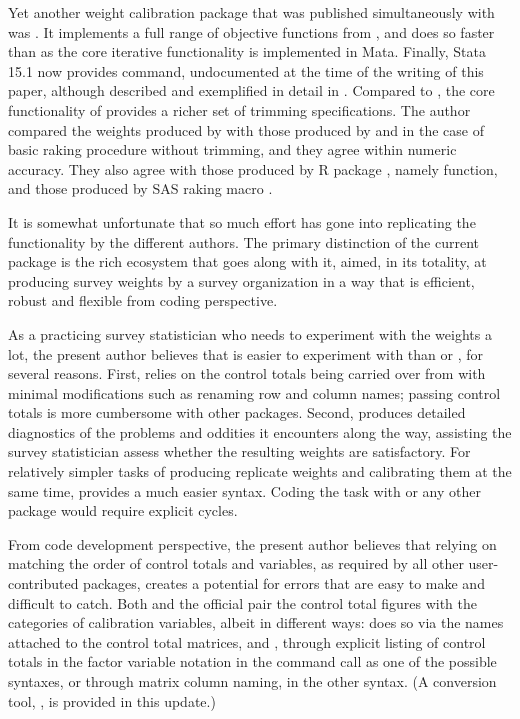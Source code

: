 Yet another weight calibration
package that was published simultaneously with \citet{kolenikov:2014}
was  \citep{pacifico:2014}. It implements a full range
of objective functions from \citet{deville:sarndal:1992}, and does so faster
than  as the core iterative functionality is implemented in Mata.
Finally, Stata 15.1 now provides  command,
undocumented at the time of the writing of this paper, although described 
and exemplified in detail in \citet{dever:valliant:2017}. Compared
to , the core functionality of  provides
a richer set of trimming specifications. The author compared the weights
produced by  with those produced by 
and 
in the case of basic raking procedure without trimming, and they agree within
numeric accuracy. They also agree with those produced by R package
, namely  function, 
and those produced by SAS raking macro  
\citep{izrael:batt:batt:ball:2017}.

It is somewhat unfortunate that so much effort has gone into replicating
the functionality by the different authors. The primary distinction of the current
 package is the rich ecosystem that goes along with it, aimed, 
in its totality, at producing survey weights by a survey organization in 
a way that is efficient, robust and flexible from coding perspective. 

As a practicing survey statistician who needs to experiment
with the weights a lot, the present author believes that 
is easier to experiment with than  or , for several reasons.
First,  relies on the control totals being carried over from  
with minimal modifications such as renaming row and column names; 
passing control totals is more cumbersome with other packages.
Second,  produces detailed diagnostics of the problems and oddities
it encounters along the way, assisting the survey statistician assess whether 
the resulting weights are satisfactory. For relatively simpler tasks of producing
replicate weights and calibrating them at the same time,  provides
a much easier syntax. Coding the task with  or any other package would 
require explicit cycles.

From code development perspective, the present author believes that relying 
on matching the order of control
totals and variables, as required by all other user-contributed packages,
creates a potential for errors that are easy to make and difficult to catch.
Both  and the official  pair the control total
figures with the categories of calibration variables,
albeit in different ways:  does so via the names attached
to the control total matrices, and , through explicit listing
of control totals in the factor variable notation in the command call
as one of the possible syntaxes, or through matrix column naming, in the other syntax.
(A conversion tool, , is provided in this update.)

